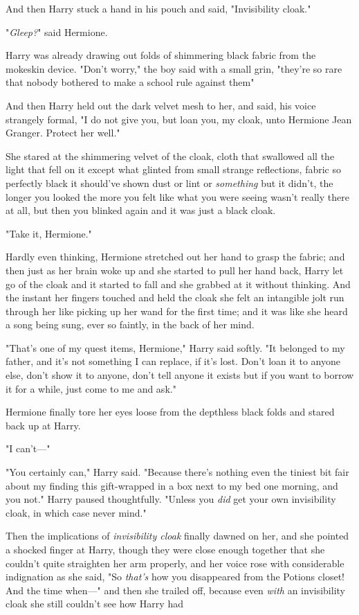And then Harry stuck a hand in his pouch and said, "Invisibility cloak."

"\emph{Gleep?}" said Hermione.

Harry was already drawing out folds of shimmering black fabric from the
mokeskin device. "Don't worry," the boy said with a small grin, "they're so
rare that nobody bothered to make a school rule against them{\el}"

And then Harry held out the dark velvet mesh to her, and said, his voice
strangely formal, "I do not give you, but loan you, my cloak, unto Hermione
Jean Granger. Protect her well."

She stared at the shimmering velvet of the cloak, cloth that swallowed all the
light that fell on it except what glinted from small strange reflections,
fabric so perfectly black it should've shown dust or lint or \emph{something}
but it didn't, the longer you looked the more you felt like what you were
seeing wasn't really there at all, but then you blinked again and it was just a
black cloak.

"Take it, Hermione."

Hardly even thinking, Hermione stretched out her hand to grasp the fabric; and
then just as her brain woke up and she started to pull her hand back, Harry let
go of the cloak and it started to fall and she grabbed at it without thinking.
And the instant her fingers touched and held the cloak she felt an intangible
jolt run through her like picking up her wand for the first time; and it was
like she heard a song being sung, ever so faintly, in the back of her mind.

"That's one of my quest items, Hermione," Harry said softly. "It belonged to my
father, and it's not something I can replace, if it's lost. Don't loan it to
anyone else, don't show it to anyone, don't tell anyone it exists{\el} but
if you want to borrow it for a while, just come to me and ask."

Hermione finally tore her eyes loose from the depthless black folds and stared
back up at Harry.

"I can't---"

"You certainly can," Harry said. "Because there's nothing even the tiniest bit
fair about my finding this gift-wrapped in a box next to my bed one morning,
and you{\el} not." Harry paused thoughtfully. "Unless you \emph{did} get
your own invisibility cloak, in which case never mind."

Then the implications of \emph{invisibility cloak} finally dawned on her, and
she pointed a shocked finger at Harry, though they were close enough together
that she couldn't quite straighten her arm properly, and her voice rose with
considerable indignation as she said, "So \emph{that's} how you disappeared
from the Potions closet! And the time when---" and then she trailed off,
because even \emph{with} an invisibility cloak she still couldn't see how Harry
had{\el}

